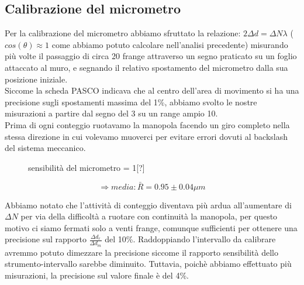 \documentclass{article}
\theoremstyle{definition}
\begin{document}
\subsection{Calibrazione del micrometro}
Per la calibrazione del micrometro abbiamo sfruttato la relazione: \(2  \Delta d = \Delta N \lambda\) (\(cos(\theta) \approx 1\) come abbiamo potuto calcolare nell'analisi precedente) misurando più volte il passaggio di circa 20 frange attraverso un segno praticato su un foglio attaccato al muro, e segnando il relativo spostamento del micrometro dalla sua posizione iniziale. \\
Siccome la scheda PASCO indicava che al centro dell'area di movimento si ha una precisione sugli spostamenti massima del 1\%, abbiamo svolto le nostre misurazioni a partire dal segno del 3 su un range ampio 10.\\
Prima di ogni conteggio ruotavamo la manopola facendo un giro completo nella stessa direzione in cui volevamo muoverci per evitare errori dovuti al backslash del sistema meccanico.

\pagebreak


\begin{figure}[!htbp]
    	\captionsetup{labelformat=empty}
             \caption{sensibilità del micrometro = 1[?]}
    \end{figure}
\[\Rightarrow  media:\bar{R}= 0.95 \pm 0.04 \mu m\]

\noindent Abbiamo notato che l'attività di conteggio diventava più ardua all'aumentare di \(\Delta N\) per via della difficoltà a ruotare con continuità la manopola, per questo motivo ci siamo fermati solo a venti frange, comunque sufficienti per ottenere una precisione sul rapporto \(\frac{\Delta d_{r}}{\Delta d_{m}}\) del 10\%.
Raddoppiando l'intervallo da calibrare avremmo potuto dimezzare la precisione siccome il rapporto sensibilità dello strumento-intervallo sarebbe diminuito. Tuttavia, poichè abbiamo effettuato più misurazioni, la precisione sul valore finale è del 4\%.
\end{document}
